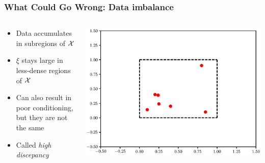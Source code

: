\documentclass[aspectratio=169]{beamer}
\begin{document}
\begin{frame}\frametitle{What Could Go Wrong: Data imbalance}
\begin{columns}
\begin{column}{0.6\textwidth}
\begin{itemize}
\pause
\item Data accumulates in subregions of ${\cal X}$
\item {\color{red} $\xi$ stays large in less-dense regions of ${\cal X}$}
\item Can also result in poor conditioning, but they are not the same
\item Called {\it high discepancy}
\end{itemize}
\end{column}
\begin{column}{0.4\textwidth}
\includegraphics[width=\textwidth]{imbalanced-data.eps}
\end{column}
\end{columns}
\end{frame}
\end{document}
